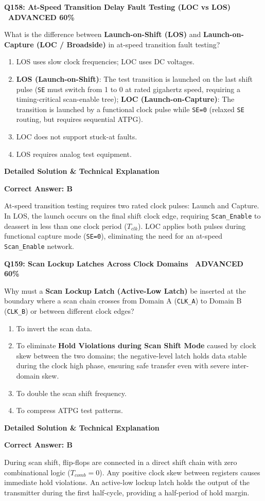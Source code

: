 \documentclass[11pt,a4paper]{article}
\newcommand{\badgeadv}{{\color{white}\colorbox{advred}{\bfseries\sffamily\tiny\ ADVANCED 60\%\ }}}
\newenvironment{qbox}[2]{%
  \begin{mdframed}[style=qstyle]%
  {\bfseries\sffamily\color{primaryblue}#1 \hfill #2}\par\vspace{2pt}%
}{%
  \end{mdframed}%
}
\newenvironment{ansbox}{%
  \begin{mdframed}[style=ansstyle]%
  {\bfseries\sffamily\color{ansgreen}\small Detailed Solution \& Technical Explanation}\par\vspace{2pt}\small%
}{%
  \end{mdframed}%
}
\begin{document}
\begin{qbox}{Q158: At-Speed Transition Delay Fault Testing (LOC vs LOS)}{\badgeadv}
What is the difference between \textbf{Launch-on-Shift (LOS)} and \textbf{Launch-on-Capture (LOC / Broadside)} in at-speed transition fault testing?
\begin{enumerate}[label=\textbf{\Alph*.}]
  \item LOS uses slow clock frequencies; LOC uses DC voltages.
  \item \textbf{LOS (Launch-on-Shift)}: The test transition is launched on the last shift pulse (\texttt{SE} must switch from 1 to 0 at rated gigahertz speed, requiring a timing-critical scan-enable tree); \textbf{LOC (Launch-on-Capture)}: The transition is launched by a functional clock pulse while \texttt{SE=0} (relaxed \texttt{SE} routing, but requires sequential ATPG).
  \item LOC does not support stuck-at faults.
  \item LOS requires analog test equipment.
\end{enumerate}
\end{qbox}
\begin{ansbox}
\textbf{Correct Answer: B}

At-speed transition testing requires two rated clock pulses: Launch and Capture. In LOS, the launch occurs on the final shift clock edge, requiring \texttt{Scan\_Enable} to deassert in less than one clock period ($T_{clk}$). LOC applies both pulses during functional capture mode (\texttt{SE=0}), eliminating the need for an at-speed \texttt{Scan\_Enable} network.
\end{ansbox}

\begin{qbox}{Q159: Scan Lockup Latches Across Clock Domains}{\badgeadv}
Why must a \textbf{Scan Lockup Latch (Active-Low Latch)} be inserted at the boundary where a scan chain crosses from Domain A (\texttt{CLK\_A}) to Domain B (\texttt{CLK\_B}) or between different clock edges?
\begin{enumerate}[label=\textbf{\Alph*.}]
  \item To invert the scan data.
  \item To eliminate \textbf{Hold Violations during Scan Shift Mode} caused by clock skew between the two domains; the negative-level latch holds data stable during the clock high phase, ensuring safe transfer even with severe inter-domain skew.
  \item To double the scan shift frequency.
  \item To compress ATPG test patterns.
\end{enumerate}
\end{qbox}
\begin{ansbox}
\textbf{Correct Answer: B}

During scan shift, flip-flops are connected in a direct shift chain with zero combinational logic ($T_{comb} = 0$). Any positive clock skew between registers causes immediate hold violations. An active-low lockup latch holds the output of the transmitter during the first half-cycle, providing a half-period of hold margin.
\end{ansbox}
\end{document}
